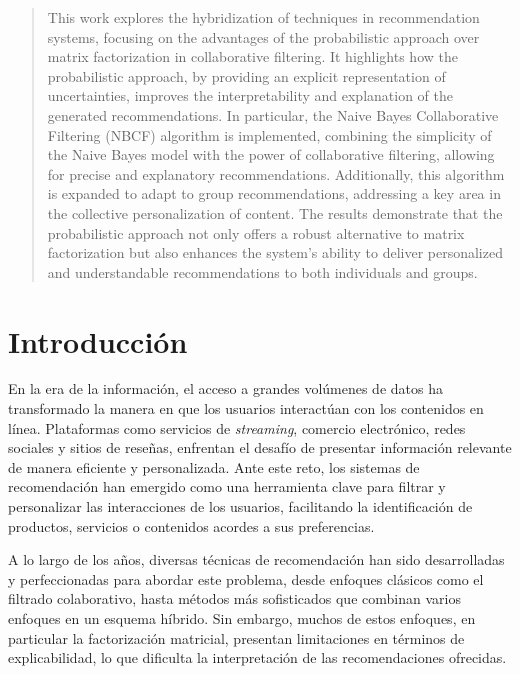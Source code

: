 \documentclass[runningheads,a4paper]{llncs}
\newenvironment{englishabstract}{%
    \renewcommand{\abstractname}{Abstract}%
    \begin{abstract}%
}{%
    \end{abstract}%
}
\begin{document}
\begin{englishabstract}
  This work explores the hybridization of techniques 
  in recommendation systems, focusing on the 
  advantages of the probabilistic approach over 
  matrix factorization in collaborative filtering. 
  It highlights how the probabilistic approach, 
  by providing an explicit representation of 
  uncertainties, improves the interpretability and 
  explanation of the generated recommendations. 
  In particular, the Naive Bayes Collaborative 
  Filtering (NBCF) algorithm is implemented, 
  combining the simplicity of the Naive Bayes model 
  with the power of collaborative filtering, 
  allowing for precise and explanatory 
  recommendations. Additionally, this algorithm is 
  expanded to adapt to group recommendations, 
  addressing a key area in the collective 
  personalization of content. The results 
  demonstrate that the probabilistic approach not 
  only offers a robust alternative to matrix 
  factorization but also enhances the system's 
  ability to deliver personalized and understandable 
  recommendations to both individuals and groups.
\end{englishabstract}

\section{Introducción}

En la era de la información, el acceso a grandes volúmenes de datos ha transformado la manera en que los usuarios interactúan con los contenidos en línea. Plataformas como servicios de \textit{streaming}, comercio electrónico, redes sociales y sitios de reseñas, enfrentan el desafío de presentar información relevante de manera eficiente y personalizada. Ante este reto, los sistemas de recomendación han emergido como una herramienta clave para filtrar y personalizar las interacciones de los usuarios, facilitando la identificación de productos, servicios o contenidos acordes a sus preferencias.

A lo largo de los años, diversas técnicas de recomendación han sido desarrolladas y perfeccionadas para abordar este problema, desde enfoques clásicos como el filtrado colaborativo, hasta métodos más sofisticados que combinan varios enfoques en un esquema híbrido. Sin embargo, muchos de estos enfoques, en particular la factorización matricial, presentan limitaciones en términos de explicabilidad, lo que dificulta la interpretación de las recomendaciones ofrecidas.
\end{document}
